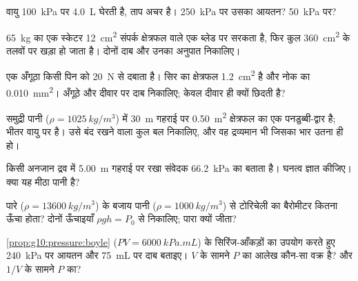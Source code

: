 \begin{exercise}[$\star$]\label{exo:g10:pressure:4}
वायु \qty{100}{kPa} पर \qty{4.0}{L} घेरती है, ताप अचर है। \qty{250}{kPa} पर उसका आयतन?
\qty{50}{kPa} पर?
\end{exercise}

\begin{exercise}[$\star$]\label{exo:g10:pressure:5}
\qty{65}{kg} का एक स्केटर \qty{12}{cm^2} संपर्क क्षेत्रफल वाले एक ब्लेड पर सरकता
है, फिर कुल \qty{360}{cm^2} के तलवों पर खड़ा हो जाता है। दोनों दाब और
उनका अनुपात निकालिए।
\end{exercise}

\begin{exercise}[$\star\star$]\label{exo:g10:pressure:6}
एक अँगूठा किसी पिन को \qty{20}{N} से दबाता है। सिर का क्षेत्रफल \qty{1.2}{cm^2} है
और नोक का \qty{0.010}{mm^2}। अँगूठे और दीवार पर दाब निकालिए; केवल दीवार
ही क्यों छिदती है?
\end{exercise}

\begin{exercise}[$\star\star$]\label{exo:g10:pressure:7}
समुद्री पानी ($\rho = \qty{1025}{kg/m^3}$) में \qty{30}{m} गहराई पर \qty{0.50}{m^2} क्षेत्रफल का एक
पनडुब्बी-द्वार है; भीतर वायु  पर है। उसे बंद रखने
वाला कुल बल निकालिए, और वह द्रव्यमान भी जिसका भार
उतना ही हो।
\end{exercise}

\begin{exercise}[$\star\star$]\label{exo:g10:pressure:8}
किसी अनजान द्रव में \qty{5.00}{m} गहराई पर रखा संवेदक \qty{66.2}{kPa} का
 बताता है। घनत्व ज्ञात कीजिए। क्या यह मीठा पानी है?
\end{exercise}

\begin{exercise}[$\star\star$]\label{exo:g10:pressure:9}
पारे ($\rho = \qty{13600}{kg/m^3}$) के बजाय पानी ($\rho = \qty{1000}{kg/m^3}$) से टोरिचेली का बैरोमीटर कितना
ऊँचा होता? दोनों ऊँचाइयाँ $\rho g h = P_0$ से निकालिए; पारा क्यों जीता?
\end{exercise}

\begin{exercise}[$\star\star$]\label{exo:g10:pressure:10}
\cref{prop:g10:pressure:boyle} ($PV = \qty{6000}{kPa.mL}$) के सिरिंज-आँकड़ों का उपयोग करते हुए \qty{240}{kPa} पर आयतन
और \qty{75}{mL} पर दाब बताइए। $V$ के सामने $P$ का आलेख
कौन-सा वक्र है? और $1/V$ के सामने $P$ का?
\end{exercise}

